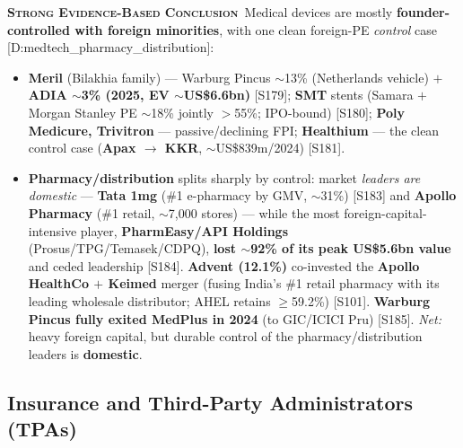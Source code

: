 \documentclass[11pt,a4paper]{article}
\newcommand{\SE}{\textcolor{secol}{\textsc{\textbf{Strong Evidence-Based Conclusion}}}}
\newcommand{\cs}[1]{\textnormal{[#1]}}
\begin{document}
\SE\ Medical devices are mostly \textbf{founder-controlled with foreign minorities}, with one clean foreign-PE \emph{control} case \cs{D:medtech\_pharmacy\_distribution}:
\begin{itemize}[leftmargin=1.4em,itemsep=2pt]
\item \textbf{Meril} (Bilakhia family) --- Warburg Pincus $\sim$13\% (Netherlands vehicle) $+$ \textbf{ADIA $\sim$3\% (2025, EV $\sim$US\$6.6bn)} \cs{S179}; \textbf{SMT} stents (Samara $+$ Morgan Stanley PE $\sim$18\% jointly $>$55\%; IPO-bound) \cs{S180}; \textbf{Poly Medicure, Trivitron} --- passive/declining FPI; \textbf{Healthium} --- the clean control case (\textbf{Apax $\rightarrow$ KKR}, $\sim$US\$839m/2024) \cs{S181}.
\item \textbf{Pharmacy/distribution} splits sharply by control: market \emph{leaders are domestic} --- \textbf{Tata 1mg} (\#1 e-pharmacy by GMV, $\sim$31\%) \cs{S183} and \textbf{Apollo Pharmacy} (\#1 retail, $\sim$7{,}000 stores) --- while the most foreign-capital-intensive player, \textbf{PharmEasy/API Holdings} (Prosus/TPG/Temasek/CDPQ), \textbf{lost $\sim$92\% of its peak US\$5.6bn value} and ceded leadership \cs{S184}. \textbf{Advent (12.1\%)} co-invested the \textbf{Apollo HealthCo $+$ Keimed} merger (fusing India's \#1 retail pharmacy with its leading wholesale distributor; AHEL retains $\ge$59.2\%) \cs{S101}. \textbf{Warburg Pincus fully exited MedPlus in 2024} (to GIC/ICICI Pru) \cs{S185}. \emph{Net:} heavy foreign capital, but durable control of the pharmacy/distribution leaders is \textbf{domestic}.
\end{itemize}

\subsection{Insurance and Third-Party Administrators (TPAs)}
\end{document}
